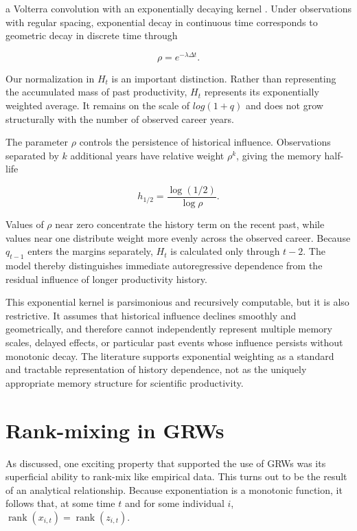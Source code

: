 \documentclass[twocolumn, letterpaper]{article}
\begin{document}
a Volterra convolution with an exponentially decaying kernel \citep{volterrakernel}. Under observations with regular spacing, exponential decay in continuous time corresponds to geometric decay in discrete time through

\[
\rho=e^{-\lambda\Delta t}.
\]

Our normalization in $H_t$ is an important distinction. Rather than representing the accumulated mass of past productivity, $H_t$ represents its exponentially weighted average. It remains on the scale of $log(1+q)$ and does not grow structurally with the number of observed career years.

The parameter $\rho$ controls the persistence of historical influence. Observations separated by $k$ additional years have relative weight $\rho^k$, giving the memory half-life

\begin{equation}
h_{1/2}=
\frac{\log(1/2)}{\log\rho}.
\label{eq:memory_half_life}
\end{equation}

Values of $\rho$ near zero concentrate the history term on the recent past, while values near one distribute weight more evenly across the observed career. Because $q_{t-1}$ enters the margins separately, $H_t$ is calculated only through $t-2$. The model thereby distinguishes immediate autoregressive dependence from the residual influence of longer productivity history.

This exponential kernel is parsimonious and recursively computable, but it is also restrictive. It assumes that historical influence declines smoothly and geometrically, and therefore cannot independently represent multiple memory scales, delayed effects, or particular past events whose influence persists without monotonic decay. The literature supports exponential weighting as a standard and tractable representation of history dependence, not as the uniquely appropriate memory structure for scientific productivity.


\section{Rank-mixing in GRWs}
\label{supp:grw_rankmixing}
As discussed, one exciting property that supported the use of GRWs was its superficial ability to rank-mix like empirical data. This turns out to be the result of an analytical relationship. Because exponentiation is a monotonic function, it follows that, at some time $t$ and for some individual $i$, $\operatorname{rank}(x_{i,t}) = \operatorname{rank}(z_{i,t})$. 
\end{document}
